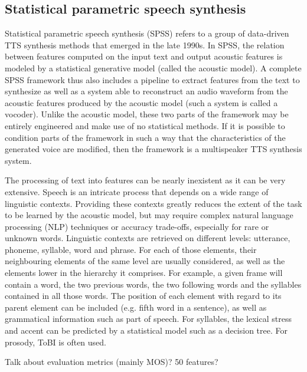 \documentclass[a4paper, oneside]{article}
\begin{document}
\subsection{Statistical parametric speech synthesis}
Statistical parametric speech synthesis (SPSS) refers to a group of data-driven TTS synthesis methods that emerged in the late 1990s. In SPSS, the relation between features computed on the input text and output acoustic features is modeled by a statistical generative model (called the acoustic model). A complete SPSS framework thus also includes a pipeline to extract features from the text to synthesize as well as a system able to reconstruct an audio waveform from the acoustic features produced by the acoustic model (such a system is called a vocoder). Unlike the acoustic model, these two parts of the framework may be entirely engineered and make use of no statistical methods. If it is possible to condition parts of the framework in such a way that the characteristics of the generated voice are modified, then the framework is a multispeaker TTS synthesis system.

The processing of text into features can be nearly inexistent as it can be very extensive. Speech is an intricate process that depends on a wide range of linguistic contexts. Providing these contexts greatly reduces the extent of the task to be learned by the acoustic model, but may require complex natural language processing (NLP) techniques or accuracy trade-offs, especially for rare or unknown words. Linguistic contexts are retrieved on different levels: utterance, phoneme, syllable, word and phrase. For each of those elements, their neighbouring elements of the same level are usually considered, as well as the elements lower in the hierarchy it comprises. For example, a given frame will contain a word, the two previous words, the two following words and the syllables contained in all those words. The position of each element with regard to its parent element can be included (e.g. fifth word in a sentence), as well as grammatical information such as part of speech. For syllables, the lexical stress and accent can be predicted by a statistical model such as a decision tree. For prosody, ToBI \citep{TOBI} is often used.

\color{red}Talk about evaluation metrics (mainly MOS)? 50 features?\color{black}
\end{document}
